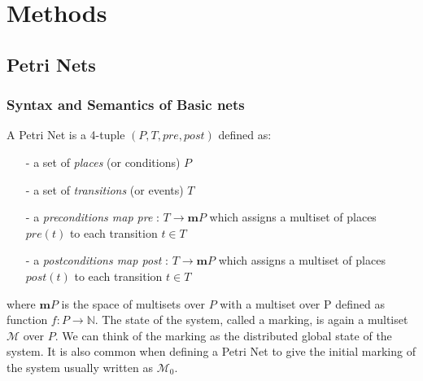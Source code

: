 
\chapter{Methods}

\ifpdf
    \graphicspath{{Chapter2/Figs/Raster/}{Chapter2/Figs/PDF/}{Chapter2/Figs/}}
\else
    \graphicspath{{Chapter2/Figs/Vector/}{Chapter2/Figs/}}
\fi



\section{Petri Nets}
\subsection{Syntax and Semantics of Basic nets}
A Petri Net is a 4-tuple $(P, T, pre, post)$ defined as:
\begin{itemize}
\item[-] a set of \textit{places} (or conditions) $P$
\item[-] a set of \textit{transitions} (or events) $T$
\item[-] a \textit{preconditions map pre} : $T \rightarrow \mathbf{m}P$ which assigns a multiset of places $pre(t)$ to each transition $t \in T$
\item[-] a \textit{postconditions map post} : $T \rightarrow \mathbf{m}P$ which assigns a multiset of places $post(t)$ to each transition $t \in T$
\end{itemize}
where $\mathbf{m}P$ is the space of multisets over $P$ with a multiset over P defined as function $f: P \rightarrow \mathbb{N}$. The state of the system, called a marking, is again a multiset $\mathcal{M}$ over $P$. We can think of the marking as the distributed global state of the system. It is also common when defining a Petri Net to give the initial marking of the system usually written as $\mathcal{M}_0$.

